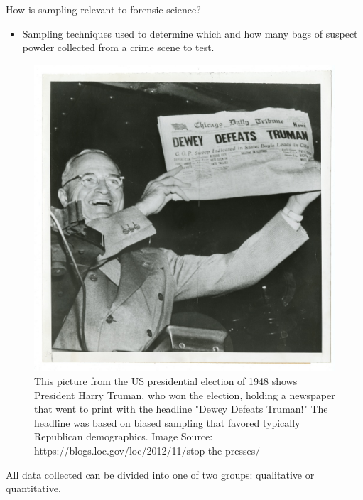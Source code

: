 \documentclass[]{book}
\providecommand{\tightlist}{%
  \setlength{\itemsep}{0pt}\setlength{\parskip}{0pt}}
\theoremstyle{definition}
\theoremstyle{definition}
\theoremstyle{remark}
\begin{document}
How is sampling relevant to forensic science?

\begin{itemize}
\tightlist
\item
  Sampling techniques used to determine which and how many bags of
  suspect powder collected from a crime scene to test.
\end{itemize}

\begin{figure}[h]

{\centering \includegraphics[width=.5\linewidth]{img/dewey} 

}

\caption{This picture from the US presidential election of 1948 shows President Harry Truman, who won the election, holding a newspaper that went to print with the headline "Dewey Defeats Truman!" The headline was based on biased sampling that favored typically Republican demographics. Image Source: https://blogs.loc.gov/loc/2012/11/stop-the-presses/}\label{fig:dewey}
\end{figure}

All data collected can be divided into one of two groups: qualitative or
quantitative.
\end{document}
